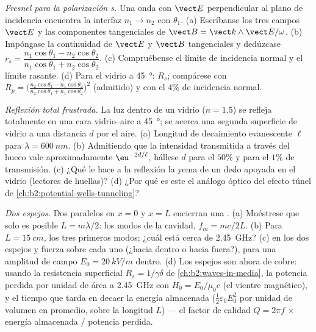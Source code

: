 \begin{exercise}[$\star\star\star$]\label{exo:b2:wave-interfaces:10}
\emph{Fresnel para la polarización s.} Una onda con $\vect E$ perpendicular
al plano de incidencia encuentra la interfaz $n_1 \to n_2$ con $\theta_1$.
(a) Escríbanse los tres campos $\vect E$ y las componentes tangenciales de
$\vect B = \vect k\wedge\vect E/\omega$. (b) Impóngase la continuidad de $\vect E$ y $\vect B$
tangenciales y dedúzcase $r_s = \dfrac{n_1\cos\theta_1 - n_2\cos\theta_2}
{n_1\cos\theta_1 + n_2\cos\theta_2}$. (c) Compruébense el límite de incidencia normal y el
límite rasante. (d) Para el vidrio a \qty{45}{\degree}: $R_s$; compárese con $R_p
= \bigl(\frac{n_2\cos\theta_1 - n_1\cos\theta_2}{n_2\cos\theta_1 + n_1\cos\theta_2}\bigr)^2$
(admitido) y con el $4\%$ de incidencia normal.
\end{exercise}

\begin{exercise}[$\star\star\star$]\label{exo:b2:wave-interfaces:11}
\emph{Reflexión total frustrada.} La luz dentro de un vidrio ($n = 1.5$) se
refleja totalmente en una cara vidrio--aire a \qty{45}{\degree}; se acerca una segunda
superficie de vidrio a una distancia $d$ por el aire. (a) Longitud de decaimiento
evanescente $\ell$ para $\lambda = \qty{600}{nm}$. (b) Admitiendo que la intensidad
transmitida a través del hueco vale aproximadamente $\eu^{-2d/\ell}$, hállese $d$ para el $50\%$
y para el $1\%$ de transmisión. (c) ¿Qué le hace a la reflexión la yema de un dedo
apoyada en el vidrio (lectores de huellas)? (d) ¿Por qué es este el
análogo óptico del efecto túnel de
\cref{ch:b2:potential-wells-tunneling}?
\end{exercise}

\begin{exercise}[$\star\star\star$]\label{exo:b2:wave-interfaces:12}
\emph{Dos espejos.} Dos  paralelos en $x = 0$ y $x =
L$ encierran una . (a) Muéstrese que solo es posible $L = m\lambda/2$:
los modos de la cavidad, $f_m = mc/2L$. (b) Para $L = \qty{15}{cm}$, los tres
primeros modos; ¿cuál está cerca de \qty{2.45}{GHz}? (c)  en los
dos espejos y fuerza sobre cada uno (¿hacia dentro o hacia fuera?), para una amplitud
de campo $E_0 = \qty{20}{kV/m}$ dentro. (d) Los espejos son ahora de cobre:
usando la resistencia superficial $R_s = 1/\gamma\delta$ de
\cref{ch:b2:waves-in-media}, la potencia perdida por unidad de área a
\qty{2.45}{GHz} con $H_0 = E_0/\mu_0c$ (el vientre magnético), y el tiempo que tarda en decaer la energía almacenada
($\tfrac12\varepsilon_0E_0^2$ por unidad de volumen en promedio, sobre la longitud $L$)
--- el factor de calidad $Q = 2\pi f\,\times$ energía almacenada / potencia perdida.
\end{exercise}

